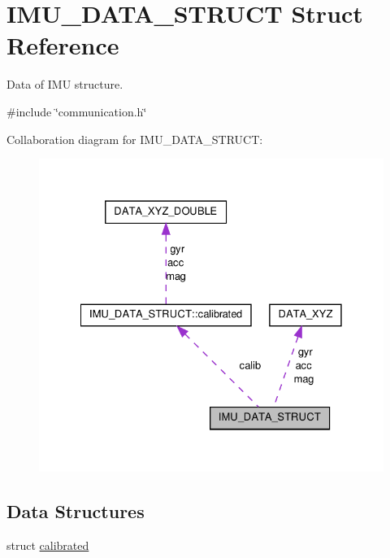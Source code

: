 \hypertarget{structIMU__DATA__STRUCT}{\section{I\-M\-U\-\_\-\-D\-A\-T\-A\-\_\-\-S\-T\-R\-U\-C\-T Struct Reference}
\label{structIMU__DATA__STRUCT}
}


Data of I\-M\-U structure.  




{\ttfamily \#include \char`\"{}communication.\-h\char`\"{}}



Collaboration diagram for I\-M\-U\-\_\-\-D\-A\-T\-A\-\_\-\-S\-T\-R\-U\-C\-T\-:
\nopagebreak
\begin{figure}[H]
\begin{center}
\leavevmode
\includegraphics[width=328pt]{structIMU__DATA__STRUCT__coll__graph}
\end{center}
\end{figure}
\subsection*{Data Structures}
\begin{DoxyCompactItemize}
\item 
struct \hyperlink{structIMU__DATA__STRUCT_1_1calibrated}{calibrated}
\end{DoxyCompactItemize}
